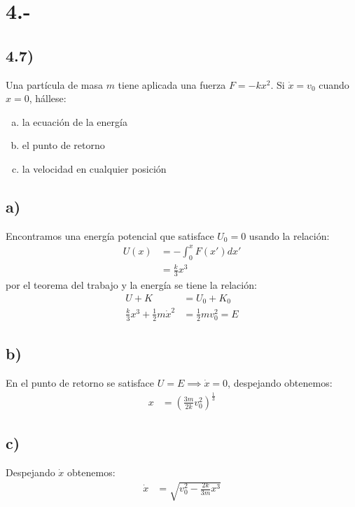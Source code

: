 \documentclass{article}
\begin{document}
\section*{4.-}
\subsection*{4.7)}
Una partícula de masa $m$ tiene aplicada una fuerza $F=-kx^2$. Si $\dot{x} = v_0$ 
cuando $x=0$, hállese:
\begin{enumerate}[a)]
    \item la ecuación de la energía
    \item el punto de retorno
    \item la velocidad en cualquier posición
\end{enumerate} 
\begin{tcolorbox}[breakable]
    \subsection*{a)}
    Encontramos una energía potencial que satisface $U_0 = 0$ usando la relación:
    \begin{align*}
        U(x)
        &= -\int_0^x F(x')dx' \\
        &= \frac{k}{3}x^3  
    \end{align*}
    por el teorema del trabajo y la energía se tiene la relación:
    \begin{align*}
        U + K &= U_0 + K_0 \\
        \frac{k}{3}x^3 + \frac{1}{2}m\dot{x}^2 &= \frac{1}{2}mv_0^2 = E
    \end{align*}
    \subsection*{b)}
    En el punto de retorno se satisface $U = E \implies \dot{x} = 0$, despejando obtenemos:
    \begin{align*}
        x &= \left(\frac{3m}{2k}v_0^2\right)^{\frac{1}{3}}
    \end{align*} 
    \subsection*{c)}
    Despejando $\dot{x}$ obtenemos:
    \begin{align*}
        \dot{x} &= \sqrt{v_0^2 - \frac{2k}{3m}x^3}
    \end{align*} 
\end{tcolorbox}
\end{document}
